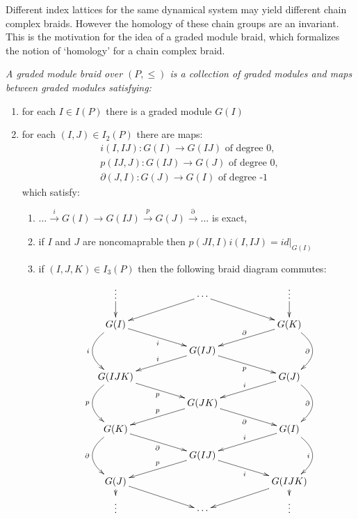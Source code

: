 Different index lattices for the same dynamical system may yield different chain complex braids.  However the homology of these chain groups are an invariant.  This is the motivation for the idea of a graded module braid, which formalizes the notion of `homology' for a chain complex braid.


\begin{defn}
{\em
A {\em graded module braid} over $(P,\leq)$ is a collection of graded modules and maps between graded modules satisfying:
\begin{enumerate}
\item for each $I\in I(P)$ there is a graded module $G(I)$
\item for each $(I,J)\in I_2(P)$ there are maps:
\begin{align*}
i(I,IJ):G(I)\to G(IJ) \text{ of degree 0,}\\
p(IJ,J):G(IJ)\to G(J) \text{ of degree 0,}\\
\partial(J,I):G(J)\to G(I) \text{ of degree -1}
\end{align*}
which satisfy:
\begin{enumerate}
\item $\ldots \xrightarrow{i} G(I)\to G(IJ)\xrightarrow{p} G(J) \xrightarrow{\partial} \ldots$ is exact,
\item if $I$ and $J$ are noncomaprable then $p(JI,I)i(I,IJ)=id|_{G(I)}$
\item if $(I,J,K)\in I_3(P)$ then the following braid diagram commutes:
\[
\xymatrixrowsep{0.15in}
\xymatrixcolsep{0.3in}
\xymatrix{
\vdots \ar@{->}[d] && \cdots \ar@{->}[drr] \ar@{->}[dll] && \vdots \ar@{->}[d]\\
G(I)\ar@/_2pc/[dd]_{i} \ar@{->}[drr]_{i} &&  && G(K)\ar@{->}[dll]_{\partial} \ar@/^2pc/[dd]_{\partial}  \\
& &G(IJ) \ar@{->}[dll]_{i} \ar@{->}[drr]_{p} &&\\
G(IJK) \ar@/_2pc/[dd]_{p}  \ar@{->}[drr]_{p} &&  && G(J)\ar@{->}[dll]_{i}  \ar@/^2pc/[dd]_{\partial}  \\
& &G(JK) \ar@{->}[dll]_{p} \ar@{->}[drr]_{\partial} &&\\
G(K)\ar@/_2pc/[dd]_{\partial}    \ar@{->}[drr]_{\partial} &&  && G(I)\ar@{->}[dll]_{i}   \ar@/^2pc/[dd]_{i} \\
& &G(IJ) \ar@{->}[dll]_{p} \ar@{->}[drr]_{i} &&\\
G(J)\ar@{->}[d] \ar@{->}[drr] &&  && G(IJK)\ar@{->}[dll]  \ar@{->}[d] \\
\vdots && \cdots && \vdots}
\] 
\end{enumerate}

\end{enumerate}
}
\end{defn}


